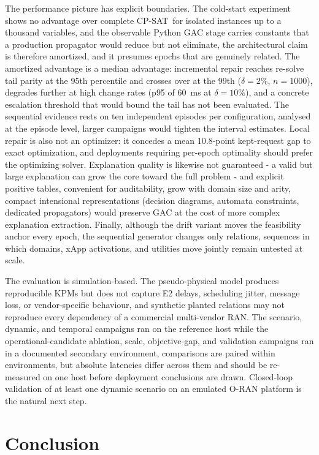 \documentclass[pdflatex,sn-mathphys-num,iicol,oneside]{sn-jnl}
\newcommand{\cpsat}{\textsc{CP-SAT}}
\begin{document}
The performance picture has explicit boundaries. The cold-start
experiment shows no advantage over complete \cpsat\ for isolated
instances up to a thousand variables, and the observable Python GAC
stage carries constants that a production propagator would reduce but
not eliminate, the architectural claim is therefore amortized, and it
presumes epochs that are genuinely related. The amortized advantage is
a median advantage: incremental repair reaches re-solve tail parity at
the 95th percentile and crosses over at the 99th ($\delta=2\%$,
$n=1000$), degrades further at high change rates (p95 of 60~ms at
$\delta=10\%$), and a concrete escalation threshold that would bound
the tail has not been evaluated. The sequential evidence rests on ten
independent episodes per configuration, analysed at the episode level,
larger campaigns would tighten the interval estimates. Local repair is
also not an optimizer: it concedes a mean 10.8-point kept-request gap
to exact optimization, and deployments requiring per-epoch optimality
should prefer the optimizing solver. Explanation quality is likewise
not guaranteed - a valid but large explanation can grow the core
toward the full problem - and explicit positive tables, convenient for
auditability, grow with domain size and arity, compact intensional
representations (decision diagrams, automata constraints, dedicated
propagators) would preserve GAC at the cost of more complex
explanation extraction. Finally, although the drift variant moves the
feasibility anchor every epoch, the sequential generator changes only
relations, sequences in which domains, xApp activations, and utilities
move jointly remain untested at scale.

The evaluation is simulation-based. The pseudo-physical model produces
reproducible KPMs but does not capture E2 delays, scheduling jitter,
message loss, or vendor-specific behaviour, and synthetic planted
relations may not reproduce every dependency of a commercial
multi-vendor RAN. The scenario, dynamic, and temporal campaigns ran on
the reference host while the operational-candidate ablation, scale,
objective-gap, and validation campaigns ran in a documented secondary
environment, comparisons are paired within environments, but absolute
latencies differ across them and should be re-measured on one host
before deployment conclusions are drawn. Closed-loop validation of at
least one dynamic scenario on an emulated O-RAN platform is the
natural next step.

\section{Conclusion}
\label{sec:conclusion}
\end{document}
